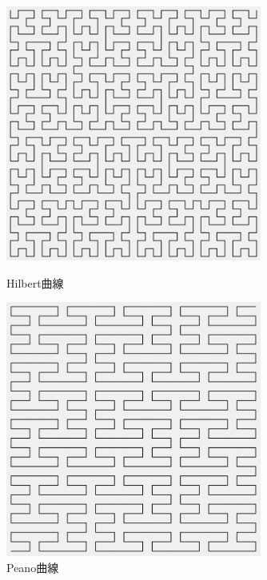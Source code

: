 \documentclass[dvipdfmx]{jsarticle}
\theoremstyle{definition}
\begin{document}
\begin{figure}[H]
    \begin{minipage}{0.49\hsize}
        \centering
        \includegraphics[width=0.75\textwidth]{figure/others/curve/hilbert_curve.png}
        \caption{Hilbert曲線}
    \end{minipage}
    \begin{minipage}{0.49\hsize}
        \centering
        \includegraphics[width=0.75\textwidth]{figure/others/curve/peano_curve.png}
        \caption{Peano曲線}
    \end{minipage}
\end{figure}
\end{document}
